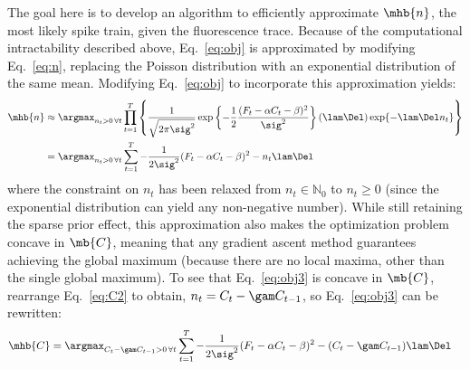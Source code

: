 The goal here is to develop an algorithm to efficiently approximate $\mhb{n}$, the most likely spike train, given the fluorescence trace. Because of the computational intractability described above, Eq.~\eqref{eq:obj} is approximated by modifying Eq.~\eqref{eq:n}, replacing the Poisson distribution with an exponential distribution of the same mean. Modifying Eq.~\eqref{eq:obj} to incorporate this approximation yields:
\begin{subequations}
\begin{align} \label{eq:obj2}
\mhb{n} &\approx \argmax_{n_t>0 \, \forall t} \prod_{t=1}^T  \left\{\frac{1}{\sqrt{2 \pi \sig^2}} \exp \left\{-\frac{1}{2}\frac{(F_t - \alpha C_t - \beta)^2}{\sig^2}\right\}  (\lam\Del) \exp\{-\lam\Del n_t\}\right\}
\\ &= \argmax_{n_t>0 \, \forall t}  \sum_{t=1}^T -\frac{1}{2 \sig^2}(F_t - \alpha C_t - \beta)^2  - n_t \lam \Del  \label{eq:obj3}
\end{align}
\end{subequations}
where the constraint on $n_t$ has been relaxed from  $n_t \in \mathbb{N}_0$ to $n_t \geq 0$ (since the exponential distribution can yield any non-negative number).  While still retaining the sparse prior effect, this approximation also makes the optimization problem concave in $\mb{C}$, meaning that any gradient ascent method guarantees achieving the global maximum (because there are no local maxima, other than the single global maximum).  To see that Eq.~\eqref{eq:obj3} is concave in $\mb{C}$, rearrange Eq.~\eqref{eq:C2} to obtain, $n_t=C_t-\gam C_{t-1}$, so Eq.~\eqref{eq:obj3} can be rewritten:
\begin{align}
\mhb{C} &= \argmax_{C_t-\gam C_{t-1}>0 \, \forall t}  \sum_{t=1}^T -\frac{1}{2 \sig^2}(F_t - \alpha C_t - \beta)^2  - (C_t -\gam C_{t-1}) \lam \Del  \label{eq:obj4}
\end{align}
